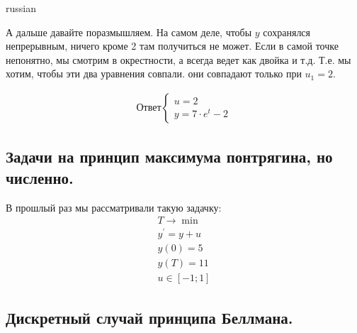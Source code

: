 \documentclass{article}
\begin{document}
\begin{otherlanguage*}{russian}
\begin{enumerate}
А дальше давайте поразмышляем. На самом деле, чтобы $ y $ сохранялся непрерывным, ничего кроме 2 там получиться не может. Если в самой точке непонятно, мы смотрим в окрестности, а всегда ведет как двойка и т.д. Т.е. мы хотим, чтобы эти два уравнения совпали. они совпадают только при $ u_1 = 2 $. 

\begin{align*}
\text{Ответ} 
\begin{cases} 
u = 2 \\
y = 7 \cdot e^t - 2
\end{cases}
\end{align*}
\subsection*{Задачи на принцип максимума понтрягина, но численно. }
В прошлый раз мы рассматривали такую задачку:
\begin{align*}
T \rightarrow \min \\
y^{'} = y + u\\ 
y(0) = 5 \\
y(T) = 11 \\
u \in [-1; 1] 
\end{align*}
\subsection*{Дискретный случай принципа Беллмана.}

\end{enumerate}
\end{otherlanguage*}
\end{document}
